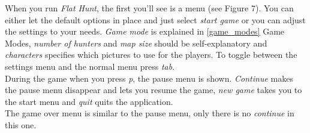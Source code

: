   When you run \emph{Flat Hunt}, the first you'll see is a menu (see Figure 7). You can either let the default options in place and just select \emph{start game} or you can adjust the settings to your needs. \emph{Game mode} is explained in \ref{game_modes} Game Modes, \emph{number of hunters} and \emph{map size} should be self-explanatory and \emph{characters} specifies which pictures to use for the players. To toggle between the settings menu and the normal menu press \emph{tab}.\\

  During the game when you press \emph{p}, the pause menu is shown. \emph{Continue} makes the pause menu disappear and lets you resume the game, \emph{new game} takes you to the start menu and \emph{quit} quits the application.\\

  The game over menu is similar to the pause menu, only there is no \emph{continue} in this one.
